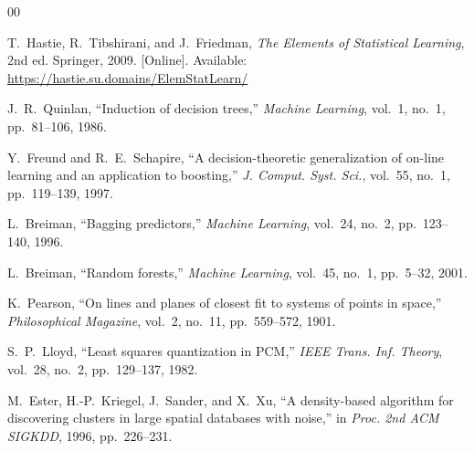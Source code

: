 \documentclass[conference]{IEEEtran}
\begin{document}
\begin{thebibliography}{00}

T.~Hastie, R.~Tibshirani, and J.~Friedman,
\textit{The Elements of Statistical Learning}, 2nd ed.
Springer, 2009.
[Online]. Available: \url{https://hastie.su.domains/ElemStatLearn/}

J.~R.~Quinlan,
``Induction of decision trees,''
\textit{Machine Learning}, vol.~1, no.~1, pp.~81--106, 1986.

Y.~Freund and R.~E.~Schapire,
``A decision-theoretic generalization of on-line learning and an
application to boosting,''
\textit{J. Comput. Syst. Sci.}, vol.~55, no.~1, pp.~119--139, 1997.

L.~Breiman,
``Bagging predictors,''
\textit{Machine Learning}, vol.~24, no.~2, pp.~123--140, 1996.

L.~Breiman,
``Random forests,''
\textit{Machine Learning}, vol.~45, no.~1, pp.~5--32, 2001.

K.~Pearson,
``On lines and planes of closest fit to systems of points in space,''
\textit{Philosophical Magazine}, vol.~2, no.~11, pp.~559--572, 1901.

S.~P.~Lloyd,
``Least squares quantization in PCM,''
\textit{IEEE Trans. Inf. Theory}, vol.~28, no.~2, pp.~129--137, 1982.

M.~Ester, H.-P.~Kriegel, J.~Sander, and X.~Xu,
``A density-based algorithm for discovering clusters in large
spatial databases with noise,''
in \textit{Proc. 2nd ACM SIGKDD}, 1996, pp.~226--231.

\end{thebibliography}

% 
\end{document}
